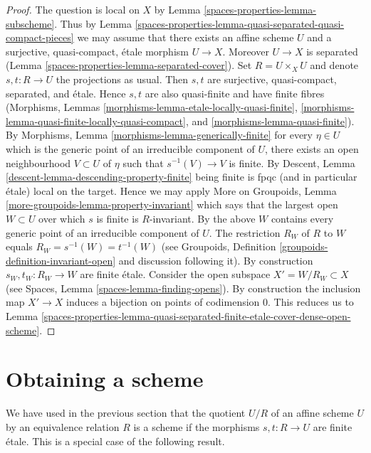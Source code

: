 \begin{proof}
The question is local on $X$ by Lemma \ref{spaces-properties-lemma-subscheme}.
Thus by Lemma \ref{spaces-properties-lemma-quasi-separated-quasi-compact-pieces}
we may assume that there exists an affine scheme $U$ and a
surjective, quasi-compact, \'etale morphism $U \to X$.
Moreover $U \to X$ is separated (Lemma \ref{spaces-properties-lemma-separated-cover}).
Set $R = U \times_X U$ and denote $s, t : R \to U$ the projections
as usual. Then $s, t$ are surjective, quasi-compact, separated, and
\'etale. Hence $s, t$ are also quasi-finite and have finite fibres
(Morphisms,
Lemmas \ref{morphisms-lemma-etale-locally-quasi-finite},
\ref{morphisms-lemma-quasi-finite-locally-quasi-compact}, and
\ref{morphisms-lemma-quasi-finite}).
By Morphisms, Lemma \ref{morphisms-lemma-generically-finite}
for every $\eta \in U$ which is the generic point of an
irreducible component of $U$, there exists an open neighbourhood
$V \subset U$ of $\eta$ such that $s^{-1}(V) \to V$ is finite. By
Descent, Lemma \ref{descent-lemma-descending-property-finite}
being finite is fpqc (and in particular \'etale) local on the target.
Hence we may apply
More on Groupoids, Lemma \ref{more-groupoids-lemma-property-invariant}
which says that the largest open $W \subset U$ over which $s$ is
finite is $R$-invariant. By the above $W$ contains every
generic point of an irreducible component of $U$.
The restriction $R_W$ of $R$ to $W$ equals $R_W = s^{-1}(W) = t^{-1}(W)$
(see Groupoids, Definition \ref{groupoids-definition-invariant-open}
and discussion following it).
By construction $s_W, t_W : R_W \to W$ are finite \'etale.
Consider the open subspace $X' = W/R_W \subset X$ (see
Spaces, Lemma \ref{spaces-lemma-finding-opens}).
By construction the inclusion map $X' \to X$
induces a bijection on points of codimension $0$.
This reduces us to
Lemma \ref{spaces-properties-lemma-quasi-separated-finite-etale-cover-dense-open-scheme}.
\end{proof}

\section{Obtaining a scheme}
\label{spaces-properties-section-getting-a-scheme}
We have used in the previous section that the quotient $U/R$ of an
affine scheme $U$ by an equivalence relation $R$ is a scheme if the
morphisms $s, t : R \to U$ are finite \'etale. This is a special case
of the following result.


